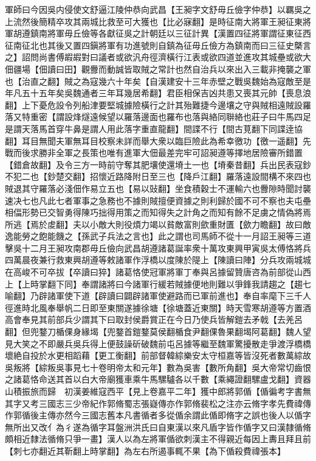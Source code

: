 軍師曰今因吳内侵使文舒逼江陵仲恭向武昌【王昶字文舒毋丘儉字仲恭】以羈吳之上流然後簡精卒攻其兩城比救至可大獲也【比必寐翻】是時征南大將軍王昶征東將軍胡遵鎮南將軍毋丘儉等各獻征吳之計朝廷以三征計異【漢置四征將軍謂征東征西征南征北也其後又置四鎭將軍有功進號則自鎮為征毋丘儉方為鎮南而曰三征史槩言之】詔問尚書傅嘏嘏對曰議者或欲汎舟徑濟橫行江表或欲四道並進攻其城壘或欲大佃疆場【佃讀曰田】觀釁而動誠皆取賊之常計也然自治兵以來出入三載非掩襲之軍也【治直之翻】賊之為寇幾六十年矣【自漢建安十三年赤壁之戰吳魏始為寇敵至是年凡五十五年矣吳魏通者三年耳幾居希翻】君臣相保吉凶共患又喪其元帥【喪息浪翻】上下憂危設令列船津要堅城據險橫行之計其殆難捷今邊壤之守與賊相遠賊設羅落又特重密【謂設烽燧遠候望以羅落邊面也羅布也落與絡同聨絡也莊子曰牛馬四足是謂天落馬首穿牛鼻是謂人用此落字重直龍翻】間諜不行【間古莧翻下同諜逹協翻】耳目無聞夫軍無耳目校察未詳而舉大衆以臨巨險此為希幸徼功【徼一遥翻】先戰而後求勝非全軍之長策也唯有進軍大佃最差完牢可詔昶遵等擇地居險審所錯置【錯倉故翻】及令三方一時前守奪其肥壤使還塉土一也【塉秦昔翻】兵出民表寇鈔不犯二也【鈔楚交翻】招懷近路降附日至三也【降戶江翻】羅落遠設間構不來四也賊退其守羅落必淺佃作易立五也【易以䜴翻】坐食積穀士不運輸六也釁隙時聞討襲速决七也凡此七者軍事之急務也不據則賊擅便資據之則利歸於國不可不察也夫屯壘相偪形勢已交智勇得陳巧拙得用策之而知得失之計角之而知有餘不足虜之情偽將焉所逃【焉於䖍翻】夫以小敵大則役煩力竭以貧敵富則歛重財匱【歛力瞻翻】故曰敵逸能勞之飽能饑之【孫武子兵法之言也】此之謂也司馬師不從十一月詔王昶等三道擊吳十二月王昶攻南郡毋丘儉向武昌胡遵諸葛誕率衆十萬攻東興甲寅吳太傅恪將兵四萬晨夜兼行救東興胡遵等敕諸軍作浮橋以度陳於隄上【陳讀曰陣】分兵攻兩城城在高峻不可卒拔【卒讀曰猝】諸葛恪使冠軍將軍丁奉與呂據留贊唐咨為前部從山西上【上時掌翻下同】奉謂諸將曰今諸軍行緩若賊據便地則難以爭鋒我請趨之【趨七喻翻】乃辟諸軍使下道【辟讀曰闢辟諸軍使避路而已軍前進也】奉自率麾下三千人徑進時北風奉舉帆二日即至東關遂據徐塘【徐塘蓋近東關】時天雪寒胡遵等方置酒高會奉見其前部兵少謂其下曰取封侯爵賞正在今日乃使兵皆解鎧去矛戟【去羌呂翻】但兜鍪刀楯倮身緣堨【兜鍪首鎧鍪莫侯翻楯食尹翻倮魯果翻堨阿葛翻】魏人望見大笑之不即嚴兵吳兵得上便鼓譟斫破魏前屯呂據等繼至魏軍驚擾散走爭渡浮橋橋壞絶自投於水更相蹈藉【更工衡翻】前部督韓綜樂安太守桓嘉等皆沒死者數萬綜故吳叛將【綜叛吳事見七十卷明帝太和元年】數為吳害【數所角翻】吳大帝常切齒恨之諸葛恪命送其首以白大帝廟獲車乘牛馬騾驢各以千數【乘繩證翻騾盧戈翻】資器山積振旅而歸　初漢姜維寇西平【見上卷嘉平二年】獲中郎將郭偱【偱徧考字書無其字又考三國志三少帝紀作郭脩蜀志張嶷傳亦作郭脩裴松之注亦云脩字孝先費禕傳作郭循後主傳亦然今三國志舊本凡書循者多從偱余謂此偱即脩字之誤也後人以偱字無所出又改亻為彳遂為循字耳盤洲洪氏曰自東漢以來凡盾字皆作偱字又曰漢隸循脩頗相近隸法循脩只爭一畫】漢人以為左將軍偱欲刺漢主不得親近每因上夀且拜且前【刺七亦翻近其靳翻上時掌翻】為左右所遏事輒不果【為下偱殺費禕張本】


